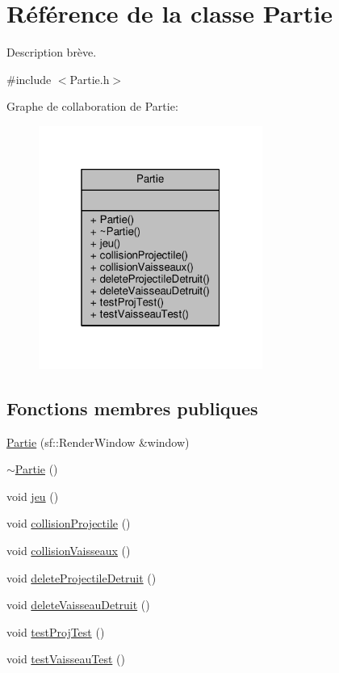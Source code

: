 \hypertarget{class_partie}{}\section{Référence de la classe Partie}
\label{class_partie}


Description brève.  




{\ttfamily \#include $<$Partie.\+h$>$}



Graphe de collaboration de Partie\+:\nopagebreak
\begin{figure}[H]
\begin{center}
\leavevmode
\includegraphics[width=208pt]{class_partie__coll__graph}
\end{center}
\end{figure}
\subsection*{Fonctions membres publiques}
\begin{DoxyCompactItemize}
\item 
\hyperlink{class_partie_a4ff8a252d0ca57f42abb2285cf5ad2e0}{Partie} (sf\+::\+Render\+Window \&window)
\item 
\hyperlink{class_partie_ae4afeb7336bb84427272cfb7018b5e3d}{$\sim$\+Partie} ()
\item 
void \hyperlink{class_partie_a38d54358098b3e5e47d0059a37bff5ea}{jeu} ()
\item 
void \hyperlink{class_partie_a2ed02302df62c0867ebec0fc83078da3}{collision\+Projectile} ()
\item 
void \hyperlink{class_partie_a97ce349fac7e91f3cd8cc2a547a35239}{collision\+Vaisseaux} ()
\item 
void \hyperlink{class_partie_a88b2fa21d16b97fc120ea4d0e35208af}{delete\+Projectile\+Detruit} ()
\item 
void \hyperlink{class_partie_ae3caf4ac1e50ac945783b1a0d79a85c7}{delete\+Vaisseau\+Detruit} ()
\item 
void \hyperlink{class_partie_a6f27ab32773454f2d44a1cf3ef95ba47}{test\+Proj\+Test} ()
\item 
void \hyperlink{class_partie_ad9ed353f340b606840fe4053ab7b6bf3}{test\+Vaisseau\+Test} ()
\end{DoxyCompactItemize}



